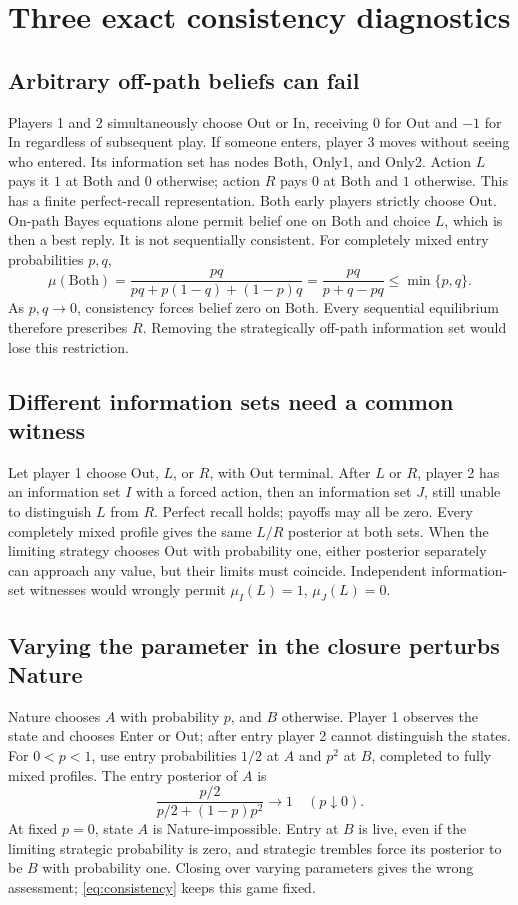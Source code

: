 \documentclass[11pt,a4paper]{article}
\numberwithin{equation}{section}
\theoremstyle{definition}
\begin{document}
\section{Three exact consistency diagnostics}\label{sec:diagnostics}
\subsection{Arbitrary off-path beliefs can fail}
Players 1 and 2 simultaneously choose Out or In, receiving \(0\)
for Out and \(-1\) for In regardless of subsequent play.
If someone enters, player 3 moves without seeing who entered.
Its information set has nodes Both, Only1, and Only2.
Action \(L\) pays it \(1\) at Both and \(0\) otherwise; action \(R\)
pays \(0\) at Both and \(1\) otherwise.
This has a finite perfect-recall representation.
Both early players strictly choose Out.
On-path Bayes equations alone permit belief one on Both and choice
\(L\), which is then a best reply. It is not sequentially consistent.
For completely mixed entry probabilities \(p,q\),
\[
 \mu(\mathrm{Both})
 =\frac{pq}{pq+p(1-q)+(1-p)q}
 =\frac{pq}{p+q-pq}\le\min\{p,q\}.
\]
As \(p,q\to0\), consistency forces belief zero on Both.
Every sequential equilibrium therefore prescribes \(R\).
Removing the strategically off-path information set would lose this
restriction.

\subsection{Different information sets need a common witness}
Let player 1 choose Out, \(L\), or \(R\), with Out terminal.
After \(L\) or \(R\), player 2 has an information set \(I\) with a
forced action, then an information set \(J\), still unable to
distinguish \(L\) from \(R\).
Perfect recall holds; payoffs may all be zero.
Every completely mixed profile gives the same \(L/R\) posterior at
both sets. When the limiting strategy chooses Out with probability
one, either posterior separately can approach any value, but their
limits must coincide.
Independent information-set witnesses would wrongly permit
\(\mu_I(L)=1\), \(\mu_J(L)=0\).

\subsection{Varying the parameter in the closure perturbs Nature}
Nature chooses \(A\) with probability \(p\), and \(B\) otherwise.
Player 1 observes the state and chooses Enter or Out; after entry
player 2 cannot distinguish the states.
For \(0<p<1\), use entry probabilities \(1/2\) at \(A\) and \(p^2\)
at \(B\), completed to fully mixed profiles.
The entry posterior of \(A\) is
\[
 \frac{p/2}{p/2+(1-p)p^2}\longrightarrow1\quad(p\downarrow0).
\]
At fixed \(p=0\), state \(A\) is Nature-impossible.
Entry at \(B\) is live, even if the limiting strategic probability
is zero, and strategic trembles force its posterior to be \(B\)
with probability one.
Closing over varying parameters gives the wrong assessment;
\eqref{eq:consistency} keeps this game fixed.
\end{document}
